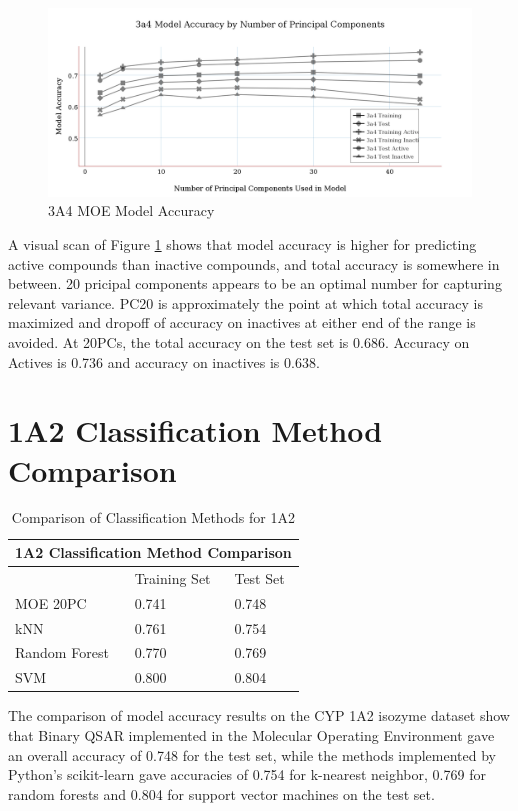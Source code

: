 \begin{figure}[H]
\includegraphics[width=1\textwidth]{../img/3a4_moe_model_accuracy.png}
\caption{3A4 MOE Model Accuracy}
\label{fig:3a4}
\end{figure}

A visual scan of Figure \ref{fig:3a4} shows that model accuracy is higher for predicting active compounds than inactive compounds, and total accuracy is somewhere in between. 20 pricipal components appears to be an optimal number for capturing relevant variance.
PC20 is approximately the point at which total accuracy is maximized and dropoff of accuracy on inactives at either end of the range is avoided.
At 20PCs, the total accuracy on the test set is 0.686. Accuracy on Actives is 0.736 and accuracy on inactives is 0.638.


\section{1A2 Classification Method Comparison}

\begin{table}[H]
\caption{Comparison of Classification Methods for 1A2}
\centering
\begin{tabular}{|l|l|l|}
\hline
\multicolumn{3}{|c|}{1A2 Classification Method Comparison} \\ \hline
          & Training Set & Test Set \\ \hline
MOE 20PC  & 0.741        & 0.748    \\ \hline
kNN       & 0.761        & 0.754    \\ \hline
Random Forest & 0.770    & 0.769    \\ \hline
SVM       & 0.800        & 0.804    \\ \hline
\end{tabular}
\end{table}

The comparison of model accuracy results on the CYP 1A2 isozyme dataset show that Binary QSAR implemented in the Molecular Operating Environment gave an overall accuracy of 0.748 for the test set, while the methods implemented by Python's scikit-learn gave accuracies of 0.754 for k-nearest neighbor, 0.769 for random forests and 0.804 for support vector machines on the test set.

